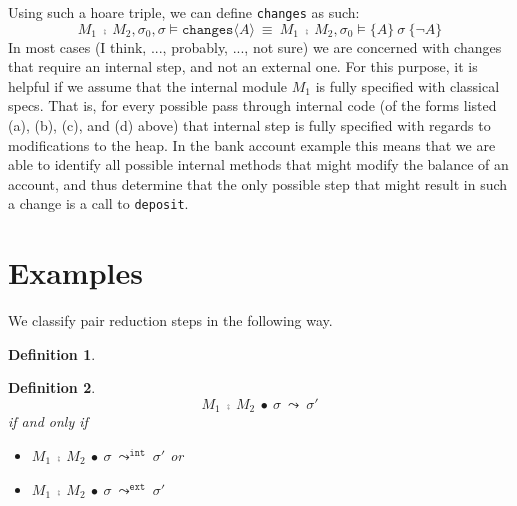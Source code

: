 \documentclass[12pt]{article}
\newtheorem{definition}{Definition}
\begin{document}
Using such a hoare triple, we can define \texttt{changes} as such:
$$M_1\ \fcmp\ M_	2, \sigma_0, \sigma \vDash \texttt{changes}\langle A \rangle\ \equiv\ M_1\ \fcmp\ M_2, \sigma_0 \vDash \{A\}\ \sigma\ \{ \neg A\}$$
In most cases (I think, ..., probably, ..., not sure) we are concerned with changes that require an internal step, and not an external one. For this purpose, 
it is helpful if we assume that the internal module $M_1$ is fully specified with classical specs. That is, for every possible pass through internal code 
(of the forms listed (a), (b), (c), and (d) above) that internal step is fully specified with regards to modifications to the heap. In the bank account example
this means that we are able to identify all possible internal methods that might modify the balance of an account, and thus determine that the only 
possible step that might result in such a change is a call to \texttt{deposit}.

\section{Examples}

We classify pair reduction steps in the following way.
\begin{definition}
\end{definition}
\begin{definition}
$$M_1\ \fcmp\ M_2\ \bullet\ \sigma\ \leadsto\ \sigma'$$
if and only if
\begin{itemize}
\item
$M_1\ \fcmp\ M_2\ \bullet\ \sigma\ \leadsto^\texttt{int}\ \sigma'$ or
\item
$M_1\ \fcmp\ M_2\ \bullet\ \sigma\ \leadsto^\texttt{ext}\ \sigma'$
\end{itemize}
\end{definition}
\end{document}
